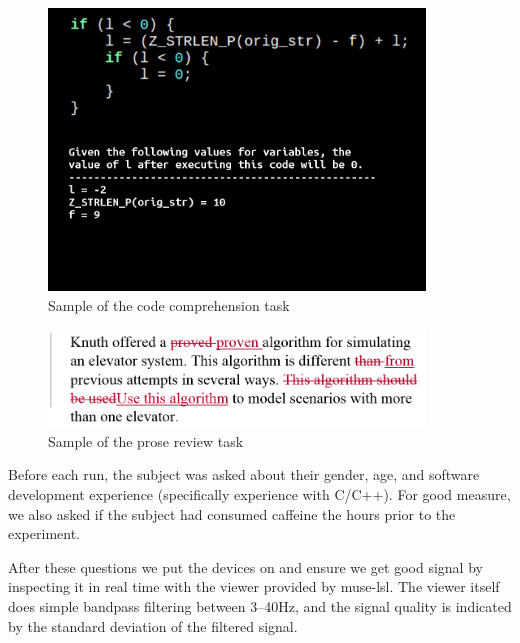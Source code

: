 \documentclass[a4paper]{article}
\begin{document}
\begin{refsection}
            \begin{figure}
                \begin{center}
                    \includegraphics[trim=0 120 0 0,clip,width=100mm]{img/final-1-1.png}
                \end{center}
                \caption{Sample of the code comprehension task}\label{fig:codetask}
            \end{figure}

            \begin{figure}
                \begin{center}
                    \includegraphics[width=100mm]{img/bugs_1.PNG}
                \end{center}
                \caption{Sample of the prose review task}\label{fig:prosetask}
            \end{figure}

            Before each run, the subject was asked about their gender, age, and software development experience (specifically experience with C/C++). For good measure, we also asked if the subject had consumed caffeine the hours prior to the experiment.

            After these questions we put the devices on and ensure we get good signal by inspecting it in real time with the viewer provided by muse-lsl. The viewer itself does simple bandpass filtering between 3--40Hz, and the signal quality is indicated by the standard deviation of the filtered signal.


\end{refsection}
\end{document}
